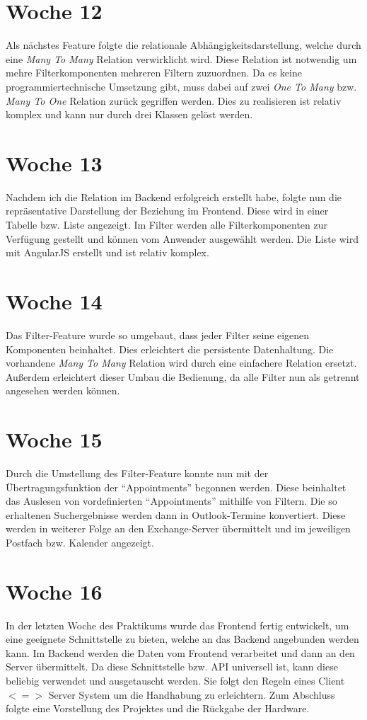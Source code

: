 \section{Woche 12} 
Als nächstes Feature folgte die relationale Abhängigkeitsdarstellung, welche durch eine \textit{Many To Many} Relation verwirklicht wird. Diese Relation ist notwendig um mehre Filterkomponenten mehreren Filtern zuzuordnen. Da es keine programmiertechnische Umsetzung gibt, muss dabei auf zwei \textit{One To Many} bzw. \textit{Many To One} Relation zurück gegriffen werden. Dies zu realisieren ist relativ komplex und kann nur durch drei Klassen gelöst werden.

\section{Woche 13}
Nachdem ich die Relation im Backend erfolgreich erstellt habe, folgte nun die repräsentative Darstellung der Beziehung im Frontend. Diese wird in einer Tabelle bzw. Liste angezeigt. Im Filter werden alle Filterkomponenten zur Verfügung gestellt und können vom Anwender ausgewählt werden. Die Liste wird mit AngularJS erstellt und ist relativ komplex. 

\section{Woche 14}
Das Filter-Feature wurde so umgebaut, dass jeder Filter seine eigenen Komponenten beinhaltet. Dies erleichtert die persistente Datenhaltung. Die vorhandene \textit{Many To Many} Relation wird durch eine einfachere Relation ersetzt. Außerdem erleichtert dieser Umbau die Bedienung, da alle Filter nun als getrennt angesehen werden können. 

\section{Woche 15}
Durch die Umstellung des Filter-Feature konnte nun mit der Übertragungsfunktion der "`Appointments"' begonnen werden. Diese beinhaltet das Auslesen von vordefinierten "`Appointments"' mithilfe von Filtern. Die so erhaltenen Suchergebnisse werden dann in Outlook-Termine konvertiert. Diese werden in weiterer Folge an den Exchange-Server übermittelt und im jeweiligen Postfach bzw. Kalender angezeigt.

\section{Woche 16}
In der letzten Woche des Praktikums wurde das Frontend fertig entwickelt, um eine geeignete Schnittstelle zu bieten, welche an das Backend angebunden werden kann. Im Backend werden die Daten vom Frontend verarbeitet und dann an den Server übermittelt. Da diese Schnittstelle bzw. API universell ist, kann diese beliebig verwendet und ausgetauscht werden. Sie folgt den Regeln eines Client\(<=>\) Server System um die Handhabung zu erleichtern. Zum Abschluss folgte eine Vorstellung des Projektes und die Rückgabe der Hardware.  


